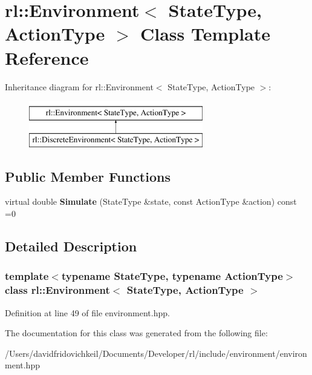 \hypertarget{classrl_1_1_environment}{}\section{rl\+:\+:Environment$<$ State\+Type, Action\+Type $>$ Class Template Reference}
\label{classrl_1_1_environment}
Inheritance diagram for rl\+:\+:Environment$<$ State\+Type, Action\+Type $>$\+:\begin{figure}[H]
\begin{center}
\leavevmode
\includegraphics[height=2.000000cm]{classrl_1_1_environment}
\end{center}
\end{figure}
\subsection*{Public Member Functions}
\begin{DoxyCompactItemize}
\item 
\hypertarget{classrl_1_1_environment_ad97a592b7af8bb74859ebc82192feffe}{}\label{classrl_1_1_environment_ad97a592b7af8bb74859ebc82192feffe} 
virtual double {\bfseries Simulate} (State\+Type \&state, const Action\+Type \&action) const =0
\end{DoxyCompactItemize}


\subsection{Detailed Description}
\subsubsection*{template$<$typename State\+Type, typename Action\+Type$>$\newline
class rl\+::\+Environment$<$ State\+Type, Action\+Type $>$}



Definition at line 49 of file environment.\+hpp.



The documentation for this class was generated from the following file\+:\begin{DoxyCompactItemize}
\item 
/\+Users/davidfridovichkeil/\+Documents/\+Developer/rl/include/environment/environment.\+hpp\end{DoxyCompactItemize}
